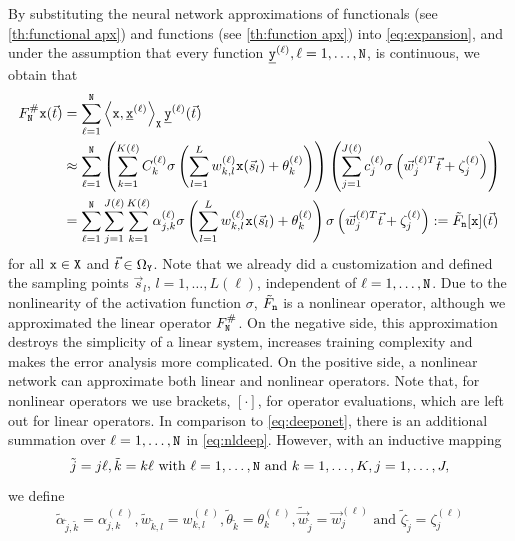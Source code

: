 \documentclass[10pt]{article}
\numberwithin{equation}{section}
\theoremstyle{nonumberplain}
\newcommand{\inner}[2]{\left<#1,#2\right>}
\newcommand{\vw}{\vec{w}}
\newcommand{\bs}{\vec{s}}
\newcommand{\bt}{\vec{t}}
\newcommand{\bw}{{\vec{w}}}
\newcommand{\X}{{\tt X}}
\newcommand{\Y}{{\tt Y}}
\newcommand{\y}{{\tt y}}
\newcommand{\n}{{\tt n}}
\newcommand{\x}{{\tt x}}
\newcommand{\ulx}{\underline{\x}}
\newcommand{\uly}{\underline{\y}}
\newcommand{\no}{{\tt N}}
\begin{document}
	By substituting the neural network approximations of functionals (see \autoref{th:functional apx}) and functions (see \autoref{th:function apx}) into \autoref{eq:expansion}, and 
	under the assumption that every function $\uly^{(\ell)}, \ell = 1,\dots,\no$, is continuous, we obtain that
	\begin{equation} \label{eq:nldeep}
		\begin{aligned}
			F_\no^\# \x(\bt) &= 
			\sum_{\ell=1}^\no \inner{\x}{\ulx^{(\ell)}}_\X \uly^{(\ell)}(\bt) \\
			&\approx \sum_{\ell=1}^\no \left(\sum_{k=1}^{K(\ell)} C_k^{(\ell)}\sigma \left(\sum_{l=1}^{L}w_{k,l}^{(\ell)} \x(\bs_l)+\theta_{k}^{(\ell)}\right)\right)\left(\sum_{j=1}^{J(\ell)}c_j^{(\ell)}\sigma\left(\bw_j ^{(\ell)T}\bt + \zeta_j^{(\ell)}\right)\right)\\
			&= \sum_{\ell=1}^\no \sum_{j=1}^{J(\ell)} \sum_{k=1}^{K(\ell)}\alpha_{j,k}^{(\ell)}\sigma \left(\sum_{l=1}^{L}w_{k,l}^{(\ell)}\x(\bs_l) + \theta_k^{(\ell)}\right) \sigma\left(\bw_j^{(\ell) T}\bt+\zeta_j^{(\ell)}\right):=\tilde{F}_\n[\x](\bt)
		\end{aligned}
	\end{equation}
for all $\x \in \X$ and $\bt \in \Omega_\Y$. Note that we already did a customization and defined the sampling points $\bs_l$, $l=1,\ldots,L(\ell)$, independent of $\ell=1,\ldots,\no$. Due to the nonlinearity of the activation function $\sigma$, $\tilde{F}_\n$ is a nonlinear operator, although we approximated the linear operator $F_\no^\#$. On the negative side, this approximation destroys the simplicity of a linear system, increases training complexity and makes the error analysis more complicated. On the positive side, a nonlinear network can approximate both linear and nonlinear operators. Note that, for nonlinear operators we use brackets, $[\cdot]$, for operator evaluations, which are left out for linear operators. In comparison to \autoref{eq:deeponet}, there is an additional summation over $\ell = 1, \ldots, \no$ in \autoref{eq:nldeep}. However, with an inductive mapping 
$$ \tilde{j} = j \ell, \tilde{k} = k \ell \text{ with } \ell=1,\ldots,\no \text{ and } k=1,\ldots,K, j=1,\ldots,J,$$ 
		we define
    \begin{equation*}
    	\tilde{\alpha}_{\tilde{j},\tilde{k}} = \alpha_{j,k}^{(\ell)}, \tilde{w}_{\tilde{k},l} = w_{k,l}^{(\ell)}, \tilde{\theta}_{\tilde{k}} = \theta_k^{(\ell)},
    	\tilde{\bw}_{\tilde{j}} = \vw_j^{(\ell)} \text{ and } \tilde{\zeta}_{\tilde{j}} = \zeta_j^{(\ell)}
    \end{equation*}
\end{document}
